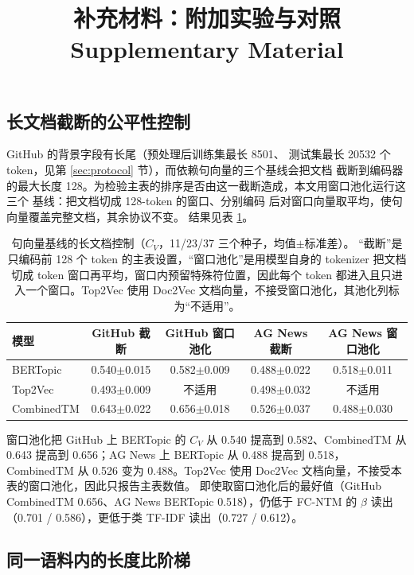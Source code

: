 \documentclass[11pt]{ctexart}
\title{\bfseries 补充材料：附加实验与对照\\[4pt]\large Supplementary Material}
\author{}
\date{}
\newcommand{\fcntm}{FC-NTM}
\begin{document}
\maketitle

\subsection{长文档截断的公平性控制}
\label{app:chunked}

GitHub 的背景字段有长尾（预处理后训练集最长 8501、
测试集最长 20532 个 token，见第 \ref{sec:protocol} 节），而依赖句向量的三个基线会把文档
截断到编码器的最大长度 128。为检验主表的排序是否由这一截断造成，本文用窗口池化运行这三个
基线：把文档切成 128-token 的窗口、分别编码
后对窗口向量取平均，使句向量覆盖完整文档，其余协议不变。
结果见表 \ref{tab:chunked}。

\begin{table}[t]
\centering
\caption{句向量基线的长文档控制（$C_V$，11/23/37 三个种子，均值$\pm$标准差）。
“截断”是只编码前 128 个 token 的主表设置，“窗口池化”是用模型自身的 tokenizer 把文档切成
token 窗口再平均，窗口内预留特殊符位置，因此每个 token 都进入且只进入一个窗口。Top2Vec
使用 Doc2Vec 文档向量，不接受窗口池化，其池化列标为“不适用”。}
\label{tab:chunked}
\small
\setlength{\tabcolsep}{4pt}
\begin{tabular}{@{}lcccc@{}}
\toprule
模型 & GitHub 截断 & GitHub 窗口池化 & AG News 截断 & AG News 窗口池化 \\
\midrule
BERTopic & 0.540$\pm$0.015 & 0.582$\pm$0.009 & 0.488$\pm$0.022 & 0.518$\pm$0.011 \\
Top2Vec & 0.493$\pm$0.009 & 不适用 & 0.498$\pm$0.032 & 不适用 \\
CombinedTM & 0.643$\pm$0.022 & 0.656$\pm$0.018 & 0.526$\pm$0.037 & 0.488$\pm$0.030 \\
\bottomrule
\end{tabular}
\end{table}

窗口池化把 GitHub 上 BERTopic 的 $C_V$ 从 0.540 提高到 0.582、CombinedTM 从 0.643
提高到 0.656；AG News 上 BERTopic 从 0.488 提高到 0.518，CombinedTM 从 0.526 变为
0.488。Top2Vec 使用 Doc2Vec 文档向量，不接受本表的窗口池化，因此只报告主表数值。
即使取窗口池化后的最好值（GitHub CombinedTM 0.656、AG News BERTopic 0.518），仍低于
\fcntm{} 的 $\beta$ 读出（0.701 / 0.586），更低于类 TF-IDF 读出（0.727 / 0.612）。

\subsection{同一语料内的长度比阶梯}
\label{sec:ladder}
\end{document}

